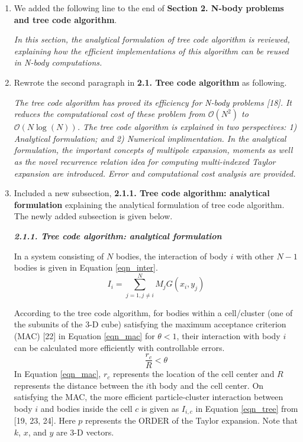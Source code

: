 \documentclass[11pt,a4paper]{article}
\begin{document}
\begin{enumerate}
\item
We added the following line to the end of \textbf{Section 2. N-body problems and tree code algorithm}.

\textit{In this section, the analytical formulation of tree code algorithm is reviewed, explaining how the efficient implementations of this algorithm can be reused in N-body computations.} 

\item
Rewrote the second paragraph in \textbf{2.1. Tree code algorithm} as following. 

\textit{
The tree code algorithm has proved its efficiency for N-body problems [18]. It reduces the computational cost of these problem from $\mathcal{O}(N^2)$ to $\mathcal{O}(N\log(N))$.
The tree code algorithm is explained in  two perspectives: 
1) Analytical formulation; and 2) Numerical implimentation.
In the analytical formulation, the important concepts of multipole expansion, moments as well as the novel recurrence relation idea for computing multi-indexed Taylor expansion are introduced.  Error and computational cost analysis are provided.
}

\item 
Included a new subsection, \textbf{2.1.1. Tree code algorithm: analytical formulation} explaining the analytical formulation of tree code algorithm.  The newly added subsection is given below.

{\it
\textbf{2.1.1. Tree code algorithm: analytical formulation}

In a system consisting of $N$ bodies, 
the interaction of  body $i$ with other $N-1$ bodies is given in Equation \ref{eqn_inter}.  
\begin{equation}
\label{eqn_inter}
I_i = \sum\limits_{j=1,j\ne i}^{N} M_jG(x_i,y_j)
\end{equation}

According to the tree code algorithm, 
for bodies within a cell/cluster (one of the subunits of the 3-D cube) 
satisfying the maximum acceptance criterion (MAC) [22]  in Equation \ref{eqn_mac} for $\theta < 1$,  
their interaction with body $i$ can be calculated more efficiently with controllable errors. 
\begin{equation}
\label{eqn_mac}
\frac{r_c}{R}<\theta 
\end{equation}
In Equation \ref{eqn_mac}, $r_c$ represents the location of the cell center and $R$ represents the distance between the $i$th body
and the cell center. On satisfying the MAC, the more efficient particle-cluster interaction between body $i$ and bodies inside the cell $c$ is given  as 
$I_{i,c}$ in Equation \ref{eqn_tree} from [19, 23, 24]. Here $p$ represents the ORDER of the Taylor expansion. Note that $k$, $x$, and $y$ are 3-D vectors. 

}
\end{enumerate}
\end{document}

